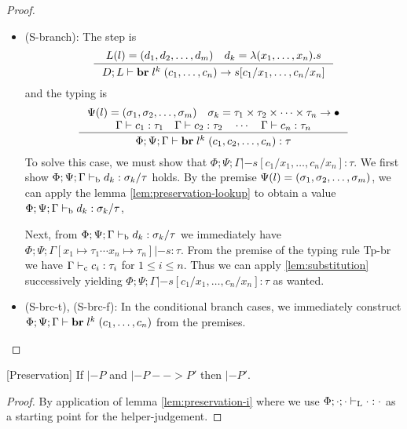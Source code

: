 \documentclass[a4paper, oneside, 10pt, draft]{memoir}
\begin{document}
\begin{proof}
\begin{itemize}
    To construct the first rule, we need to apply lemma
    \ref{lem:preservation-lookup} to $D(f) = \dotsb$ from the
    S-call premises and $\Phi : D : \Phi$ from the assumptions. This
    yields $\Phi;\cdot;[x_1 \mapsto \tau_1 \; \dotsb ;\ x_n \mapsto
    \tau_n] |- s' : \tau'$. We have $\Gamma |- c_1 : \tau_1$ from the
    premises of the Tp-call rule. Utilizing the lemma
    \ref{lem:substitution} once yields $\Phi;\cdot;[x_2 \mapsto \tau_2
    \dotsb x_n : \tau_n] |- s'[c_1/x_1] : \tau'$. Successive
    applications of lemma \ref{lem:substitution} then yields
    $\Phi;\cdot;\cdot |- s'[c_1/x_1,\dotsc,c_n/x_n] : \tau'$ as
    wanted.
  \item (S-branch):
    The step is
    \begin{equation*}
      \inference{L(l) = \dbundle \quad d_k = \lambda(x_1, \dotsc,
        x_n).s}
      {D;L |- \ibr{l^k}{(c_1, \dotsc, c_n)} -> s[c_1/x_1, \dotsc, c_n/x_n]}
    \end{equation*}
    and the typing is
    \begin{equation*}
      \inference{\Psi(l) = \bbtypes{} \quad \sigma_k =
        \ntypes -> \bullet\\
        \Gamma |- c_1 : \tau_1 \quad \Gamma |- c_2 : \tau_2 \quad \dotsb
        \quad \Gamma |- c_n : \tau_n}
      {\Phi;\Psi;\Gamma |- \ibr{l^k}(c_1, c_2, \dotsc, c_n) : \tau}
    \end{equation*}
    To solve this case, we must show that $\Phi;\Psi;\Gamma |-
    s[c_1/x_1,\dotsc,c_n/x_n] : \tau$. We first show $\Phi;\Psi;\Gamma
    |-_{\mathrm{b}} d_k : \sigma_k / \tau$ holds. By the premise $\Psi(l) =
    (\sigma_1, \sigma_2, \dotsc, \sigma_m)$, we can apply the lemma \ref{lem:preservation-lookup} to
    obtain a value $\Phi;\Psi;\Gamma |-_{\mathrm{b}} d_k : \sigma_k / \tau$,

    Next, from $\Phi;\Psi;\Gamma |-_{\mathrm{b}} d_k : \sigma_k / \tau$ we
    immediately have $\Phi;\Psi;\Gamma[x_1 \mapsto \tau_1 \dotsb x_n
    \mapsto \tau_n] |- s : \tau$. From the premise of the typing rule
    Tp-br we have $\Gamma |-_{\mathrm{c}} c_i : \tau_i$ for $1 \leq i \leq
    n$. Thus we can apply \ref{lem:substitution} successively yielding
    $\Phi;\Psi;\Gamma |- s[c_1/x_1,\dotsc,c_n/x_n] : \tau$ as wanted.
  \item (S-brc-t), (S-brc-f):
    In the conditional branch cases, we immediately construct
    $\Phi;\Psi;\Gamma |- \mathbf{br} \; l^k \; (c_1, \dotsc, c_n)$ from the
    premises.
  \end{itemize}
\end{proof}

\begin{thm}{[Preservation]}
  \label{thm:preservation}
  If $|- P$ and $|- P --> P'$ then $|- P'$.
\end{thm}
\begin{proof}
  By application of lemma \ref{lem:preservation-i} where we use
  $\Phi;\cdot;\cdot |-_{\mathrm{L}} \cdot : \cdot$ as a starting point for the
  helper-judgement.
\end{proof}
\end{document}
